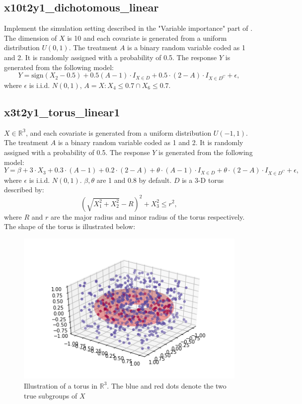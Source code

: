 \documentclass[12pt]{article}
\begin{document}
\subsection*{x10t2y1\_dichotomous\_linear}
Implement the simulation setting described in the "Variable importance" part of \cite{fu2016estimating}. The dimension of $X$ is 10 and each covariate is generated from a uniform distribution $U(0,1)$. The treatment $A$ is a binary random variable coded as 1 and 2. It is randomly assigned with a probability of 0.5. The response $Y$ is generated from the following model:
\begin{equation*}
Y=\text{sign}(X_2-0.5)+0.5(A-1)\cdot I_{X\in D}+0.5\cdot(2-A)\cdot I_{X\in D^C}+\epsilon,
\end{equation*}
where $\epsilon$ is i.i.d. $N(0,1)$, $A={X:X_4\le 0.7\cap X_6 \le 0.7}$.

\subsection*{x3t2y1\_torus\_linear1}
$X\in \mathbb{R^3}$, and each covariate is generated from a uniform distribution $U(-1,1)$. The treatment $A$ is a binary random variable coded as 1 and 2. It is randomly assigned with a probability of 0.5. The response $Y$ is generated from the following model:
\begin{equation*}
Y= \beta + 3\cdot X_3 + 0.3 \cdot (A-1) + 0.2 \cdot (2-A) +
	\theta \cdot (A-1)\cdot I_{X\in D} + \theta \cdot (2-A) \cdot I_{X\in D^C}+\epsilon,
\end{equation*}
where $\epsilon$ is i.i.d. $N(0,1)$. $\beta, \theta$ are 1 and 0.8 by default. $D$ is a 3-D torus described by:
\begin{equation*}
(\sqrt{X_1^2+X_2^2}-R)^2+X_3^2\le r^2,
\end{equation*}
where $R$ and $r$ are the major radius and minor radius of the torus respectively. The shape of the torus is illustrated below:
\begin{figure}
	\centering
	\includegraphics[width=0.7\linewidth]{donut_shape}
	\caption{Illustration of a torus in $\mathbb{R}^3$. The blue and red dots denote the two true subgroups of $X$}
\end{figure}
\end{document}
